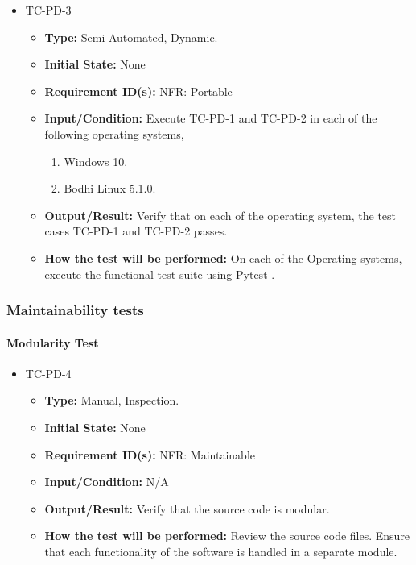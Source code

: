\documentclass[12pt, titlepage]{article}
\begin{document}
\begin{itemize}
\item{TC-PD-3\\}
\begin{itemize}

\item{\textbf{Type:}} Semi-Automated, Dynamic.
					
\item{\textbf{Initial State:}} None

\item{\textbf{Requirement ID(s):}} NFR: Portable
					
\item{\textbf{Input/Condition:}}  Execute TC-PD-1 and TC-PD-2 in each of the following 
operating systems,

\begin{enumerate}
\item Windows 10.
\item Bodhi Linux 5.1.0. 
\end {enumerate}
					
\item{\textbf{Output/Result:}} Verify that on each of the operating system, the test 
cases TC-PD-1 and TC-PD-2 passes. 

\item{\textbf{How the test will be performed:}}  On each of the Operating systems,
execute the functional test suite using  Pytest \cite{Pytest}. 

\end{itemize}
\end{itemize}


\subsubsection{Maintainability tests}

\paragraph{Modularity Test}
\begin{itemize}
\item{TC-PD-4\\}
\begin{itemize}
\item{\textbf{Type:}} Manual, Inspection.
					
\item{\textbf{Initial State:}} None

\item{\textbf{Requirement ID(s):}} NFR: Maintainable
					
\item{\textbf{Input/Condition:}}  N/A
					
\item{\textbf{Output/Result:}} Verify that the source code is modular.

\item{\textbf{How the test will be performed:}}  
Review the source code files. Ensure that each functionality of the software is 
handled in a separate module.
\end{itemize}
\end{itemize}
\end{document}
